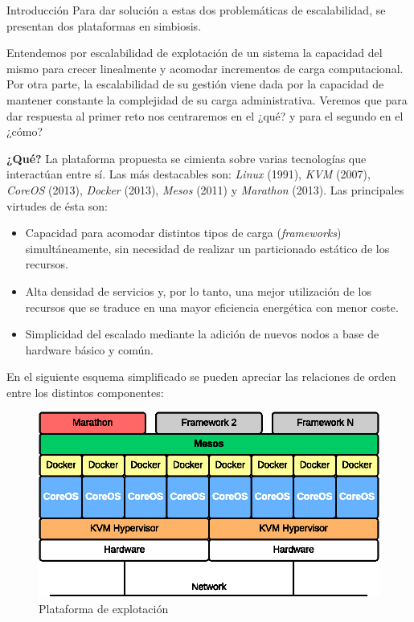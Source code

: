 \documentclass[a4paper,12pt,spanish,final]{epsc_tfc_pfc}
\begin{document}
\begin{intro}{Introducción}
Para dar solución a estas dos problemáticas de escalabilidad, se presentan dos plataformas en simbiosis.

Entendemos por escalabilidad de explotación de un sistema la capacidad del mismo para crecer linealmente y acomodar incrementos de carga computacional. Por otra parte, la escalabilidad de su gestión viene dada por la capacidad de mantener constante la complejidad de su carga administrativa. Veremos que para dar respuesta al primer reto nos centraremos en el ¿qué? y para el segundo en el ¿cómo?

\textbf{¿Qué?} La plataforma propuesta se cimienta sobre varias tecnologías que interactúan entre sí. Las más destacables son: \emph{Linux} (1991), \emph{KVM} (2007), \emph{CoreOS} (2013), \emph{Docker} (2013), \emph{Mesos} (2011) y \emph{Marathon} (2013). Las principales virtudes de ésta son:
\begin{itemize}
  \item Capacidad para acomodar distintos tipos de carga (\emph{frameworks}) simultáneamente, sin necesidad de realizar un particionado estático de los recursos.
  \item Alta densidad de servicios y, por lo tanto, una mejor utilización de los recursos que se traduce en una mayor eficiencia energética con menor coste.
  \item Simplicidad del escalado mediante la adición de nuevos nodos a base de hardware básico y común.
\end{itemize}

En el siguiente esquema simplificado se pueden apreciar las relaciones de orden entre los distintos componentes:\\

\begin{figure}[h]
  \centering
    \includegraphics[scale=1]{plataforma}
      \caption{Plataforma de explotación}
\end{figure}


\end{intro}
\end{document}
